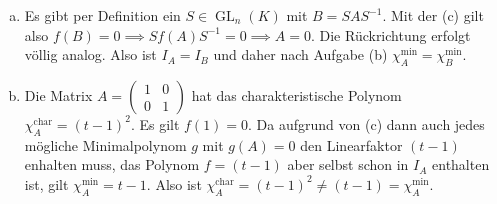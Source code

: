 \documentclass{article}
\theoremstyle{definition}
\begin{document}
\begin{enumerate}[(a)]
\[\begin{array}{c|c}
            f(\lambda) & ** \\ \hline
            0 & **\\
        \end{array}\right)S^{-1}.
    \] Für $f = \chi^\text{min}_A$ gilt daher
    \[
        \chi^\text{min}_A(A) = 0 \implies S\left(\begin{array}{c|c}
            \chi^\text{min}_A(\lambda) & ** \\ \hline
            0 & **\\
        \end{array}\right)S^{-1} = 0 \implies \chi^\text{min}_A(\lambda) = 0.
    \]
    \item Es gibt per Definition ein $S\in \operatorname{GL}_n(K)$ mit $B = SAS^{-1}$. Mit der (c) gilt also $f(B) = 0 \implies Sf(A)S^{-1} = 0 \implies A = 0$. Die Rückrichtung erfolgt völlig analog. Also ist $I_A = I_B$ und daher nach Aufgabe (b) $\chi^\text{min}_A = \chi^\text{min}_B$.
    \item Die Matrix $A = \begin{pmatrix}
                  1 & 0 \\ 0 & 1
              \end{pmatrix}$ hat das charakteristische Polynom $\chi^\text{char}_A = (t-1)^2$. Es gilt $f(1) = 0$. Da aufgrund von (c) dann auch jedes mögliche Minimalpolynom $g$ mit $g(A) = 0$ den Linearfaktor $(t-1)$ enhalten muss, das Polynom $f = (t-1)$ aber selbst schon in $I_A$ enthalten ist, gilt $\chi^\text{min}_A = t-1$. Also ist $ \chi^\text{char}_A = (t-1)^2 \neq (t-1) = \chi^\text{min}_A$.
\end{enumerate}
\end{document}
